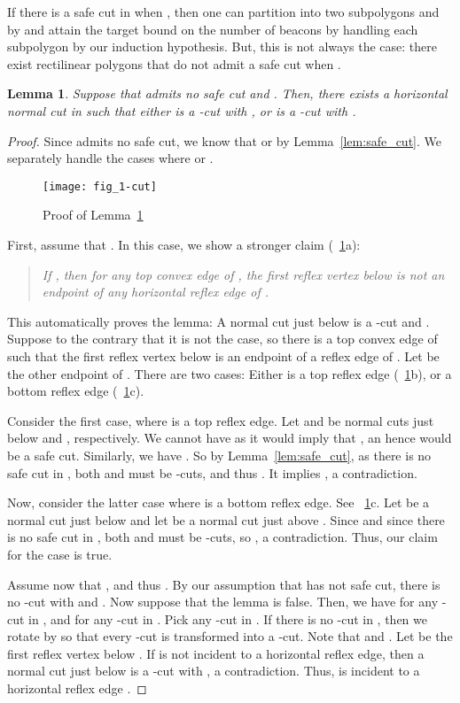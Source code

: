 \documentclass[11pt]{article}
\newtheorem{lemma}{Lemma}
\theoremstyle{definition}
\begin{document}
If there is a safe cut  in  when ,
then one can partition  into two subpolygons  and  by 
and attain the target bound  on the number of beacons
by handling each subpolygon by our induction hypothesis.
But, this is not always the case:
there exist rectilinear polygons  that do not admit a safe cut
when .

\begin{lemma} \label{lem:1-cut}
 Suppose that  admits no safe cut and .
 Then, there exists a horizontal normal cut  in  such that
 either  is a -cut with , or  is a -cut with .
\end{lemma}
\begin{proof}
Since  admits no safe cut, we know that  or 
by Lemma~\ref{lem:safe_cut}.
We separately handle the cases where  or .

\begin{figure}[tb]
\centering
\texttt{[image: fig\_1-cut]}
\caption{Proof of Lemma~\ref{lem:1-cut}}
\label{fig:1-cut}
\end{figure}


First, assume that .
In this case, we show a stronger claim (\figurename~\ref{fig:1-cut}a):
\begin{quote}
\textit{If , then for any top convex edge  of ,
the first reflex vertex  below  is not an endpoint of any horizontal reflex edge of .}
\end{quote}
This automatically proves the lemma: A normal cut  just below  is a -cut and
.
Suppose to the contrary that it is not the case,
so there is a top convex edge  of  such that
the first reflex vertex  below  is an endpoint of a reflex edge  of .
Let  be the other endpoint of .
There are two cases: Either  is a top reflex edge (\figurename~\ref{fig:1-cut}b), 
or a bottom reflex edge (\figurename~\ref{fig:1-cut}c).

Consider the first case, where  is a top reflex edge.
Let  and  be normal cuts just below  and , respectively.
We cannot have  as it would imply that  , an hence
 would be a safe cut. Similarly, we have .
So by Lemma~\ref{lem:safe_cut}, as there is no safe cut in , 
both  and  must be -cuts, and thus .
It implies , a contradiction.

Now, consider the latter case where  is a bottom reflex edge.
See \figurename~\ref{fig:1-cut}c.
Let  be a normal cut just below  and let  be a normal cut just above .
Since  and since
there is no safe cut in , both  and  must be -cuts,
so , a contradiction.
Thus, our claim for the case  is true.

Assume now that , and thus . By our assumption that  has not safe 
cut, there is no -cut  with  and .
Now suppose that the lemma is false.
Then, we have  for any -cut  in , and
 for any -cut  in .
Pick any -cut  in .
If there is no -cut in , then we rotate  by 
so that every -cut is transformed into a -cut.
Note that  and .
Let  be the first reflex vertex below .
If  is not incident to a horizontal reflex edge,
then a normal cut  just below  is a -cut with ,
a contradiction.
Thus,  is incident to a horizontal reflex edge .


\end{proof}
\end{document}
